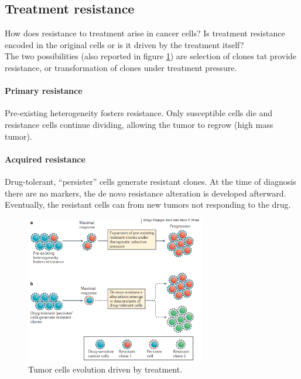 \subsection{Treatment resistance}
How does resistance to treatment arise in cancer cells? Is treatment resistance encoded in the original cells or is it driven by the treatment itself?
\\
The two possibilities (also reported in figure \ref{fig:response}) are selection of clones tat provide resistance, or transformation of clones under treatment pressure. \\

\paragraph*{Primary resistance}
Pre-existing heterogeneity fosters resistance. Only susceptible cells die and resistance cells continue dividing, allowing the tumor to regrow (high mass tumor).

\paragraph*{Acquired resistance}
Drug-tolerant, “persister” cells generate resistant clones. At the time of diagnosis there are no markers, the de novo resistance alteration is developed afterward. Eventually, the resistant cells can from new tumors not responding to the drug.


\begin{figure}[H]
	\centering
	\includegraphics[width=0.7\textwidth]{response.png}
	\caption{ Tumor cells evolution driven by treatment.}
	\label{fig:response}
\end{figure}

